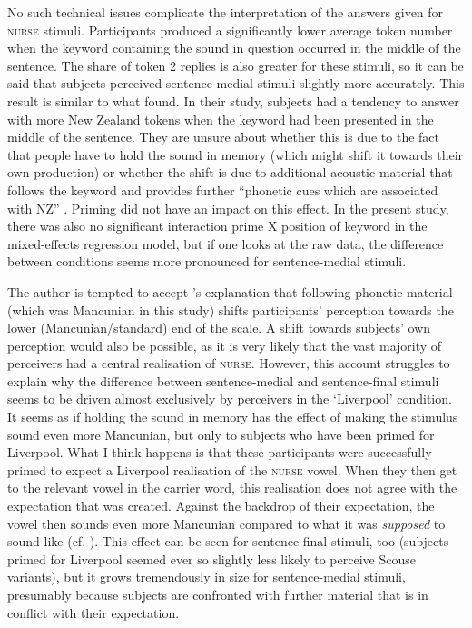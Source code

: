 No such technical issues complicate the interpretation of the answers given for \textsc{nurse} stimuli.
Participants produced a significantly lower average token number when the keyword containing the sound in question occurred in the middle of the sentence.
The share of token 2 replies is also greater for these stimuli, so it can be said that subjects perceived sentence-medial stimuli slightly more accurately.
This result is similar to what \textcite{hayetal2006a} found.
In their study, subjects had a tendency to answer with more New Zealand tokens when the keyword had been presented in the middle of the sentence.
They are unsure about whether this is due to the fact that people have to hold the sound in memory (which might shift it towards their own production) or whether the shift is due to additional acoustic material that follows the keyword and provides further ``phonetic cues which are associated with NZ'' \parencite[365]{hayetal2006a}.
Priming did not have an impact on this effect.
In the present study, there was also no significant interaction prime X position of keyword in the mixed-effects regression model, but if one looks at the raw data, the difference between  conditions seems more pronounced for sentence-medial stimuli.

The author is tempted to accept \textcite{hayetal2006a}'s explanation that following phonetic material (which was Mancunian in this study) shifts participants' perception towards the lower (Mancunian/standard) end of the scale.
A shift towards subjects' own perception would also be possible, as it is very likely that the vast majority of perceivers had a central realisation of \textsc{nurse}.
However, this account struggles to explain why the difference between sentence-medial and sentence-final stimuli seems to be driven almost exclusively by perceivers in the `Liverpool' condition.
It seems as if holding the sound in memory has the effect of making the stimulus sound even more Mancunian, but only to subjects who have been primed for Liverpool.
What I think happens is that these participants were successfully primed to expect a Liverpool realisation of the \textsc{nurse} vowel.
When they then get to the relevant vowel in the carrier word, this realisation does not agree with the expectation that was created.
Against the backdrop of their expectation, the vowel then sounds even more Mancunian compared to what it was \emph{supposed} to sound like (cf. ).
This effect can be seen for sentence-final stimuli, too (subjects primed for Liverpool seemed ever so slightly less likely to perceive Scouse variants), but it grows tremendously in size for sentence-medial stimuli, presumably because subjects are confronted with further material that is in conflict with their expectation.

